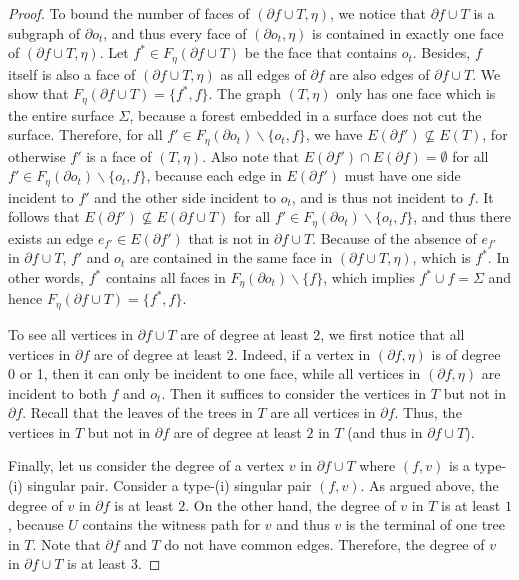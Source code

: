 \documentclass[a4paper,11pt]{article}
\numberwithin{lemma}{section}
\begin{document}
\begin{proof}
To bound the number of faces of $(\partial f \cup T, \eta)$, we notice that $\partial f \cup T$ is a subgraph of $\partial o_t$, and thus every face of $(\partial o_t,\eta)$ is contained in exactly one face of $(\partial f \cup T,\eta)$.
Let $f^* \in F_\eta(\partial f \cup T)$ be the face that contains $o_t$.
Besides, $f$ itself is also a face of $(\partial f \cup T,\eta)$ as all edges of $\partial f$ are also edges of $\partial f \cup T$.
We show that $F_\eta(\partial f \cup T) = \{f^*,f\}$.
The graph $(T,\eta)$ only has one face which is the entire surface $\varSigma$, because a forest embedded in a surface does not cut the surface.
Therefore, for all $f' \in F_\eta(\partial o_t) \backslash \{o_t,f\}$, we have $E(\partial f') \nsubseteq E(T)$, for otherwise $f'$ is a face of $(T,\eta)$.
Also note that $E(\partial f') \cap E(\partial f) = \emptyset$ for all $f' \in F_\eta(\partial o_t) \backslash \{o_t,f\}$, because each edge in $E(\partial f')$ must have one side incident to $f'$ and the other side incident to $o_t$, and is thus not incident to $f$.
It follows that $E(\partial f') \nsubseteq E(\partial f \cup T)$ for all $f' \in F_\eta(\partial o_t) \backslash \{o_t,f\}$, and thus there exists an edge $e_{f'} \in E(\partial f')$ that is not in $\partial f \cup T$.
Because of the absence of $e_{f'}$ in $\partial f \cup T$, $f'$ and $o_t$ are contained in the same face in $(\partial f \cup T,\eta)$, which is $f^*$.
In other words, $f^*$ contains all faces in $F_\eta(\partial o_t) \backslash \{f\}$, which implies $f^* \cup f = \varSigma$ and hence $F_\eta(\partial f \cup T) = \{f^*,f\}$.

To see all vertices in $\partial f \cup T$ are of degree at least $2$, we first notice that all vertices in $\partial f$ are of degree at least $2$.
Indeed, if a vertex in $(\partial f,\eta)$ is of degree 0 or 1, then it can only be incident to one face, while all vertices in $(\partial f,\eta)$ are incident to both $f$ and $o_t$.
Then it suffices to consider the vertices in $T$ but not in $\partial f$.
Recall that the leaves of the trees in $T$ are all vertices in $\partial f$.
Thus, the vertices in $T$ but not in $\partial f$ are of degree at least $2$ in $T$ (and thus in $\partial f \cup T$).

Finally, let us consider the degree of a vertex $v$ in $\partial f \cup T$ where $(f,v)$ is a type-(i) singular pair.
Consider a type-(i) singular pair $(f,v)$.
As argued above, the degree of $v$ in $\partial f$ is at least $2$.
On the other hand, the degree of $v$ in $T$ is at least $1$, because $U$ contains the witness path for $v$ and thus $v$ is the terminal of one tree in $T$.
Note that $\partial f$ and $T$ do not have common edges.
Therefore, the degree of $v$ in $\partial f \cup T$ is at least $3$.


\end{proof}
\end{document}
